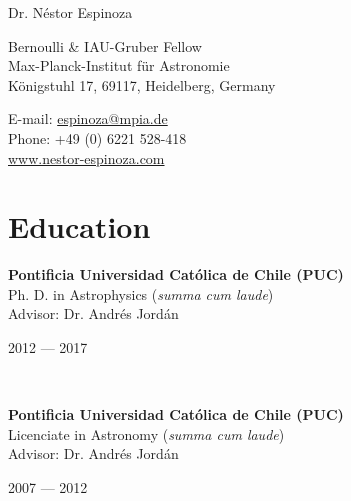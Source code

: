 \documentclass[12pt, a4paper]{article} %
\begin{document}

{\LARGE Dr. N\'estor Espinoza}\\[0.2cm] %
\begin{minipage}[t]{0.63\textwidth}
Bernoulli \& IAU-Gruber Fellow\\
Max-Planck-Institut f\"ur Astronomie\\
K\"onigstuhl 17, 69117, Heidelberg, Germany \\
\end{minipage}
\begin{minipage}[t]{0.37\textwidth}
E-mail: \href{mailto:espinoza@mpia.de}{espinoza@mpia.de}\\
Phone: +49 (0) 6221 528-418\\ 
\url{www.nestor-espinoza.com}
\end{minipage}

\hrulefill
\section*{Education}


\begin{minipage}[t]{0.6\textwidth}
\begin{flushleft}%
  \setlength{\leftskip}{0.2cm}%
\textbf{Pontificia Universidad Cat\'olica de Chile (PUC)}\\
Ph. D. in Astrophysics (\textit{summa cum laude})\\
Advisor: Dr. Andr\'es Jord\'an
 
\end{flushleft}
\end{minipage}
\begin{minipage}[t]{0.4\textwidth}
\hfill 2012 --- 2017 
\end{minipage}\\

\begin{minipage}[t]{0.6\textwidth}
\begin{flushleft}%
  \setlength{\leftskip}{0.2cm}%
\textbf{Pontificia Universidad Cat\'olica de Chile (PUC)}\\
 Licenciate in Astronomy (\textit{summa cum laude})\\
 Advisor: Dr. Andr\'es Jord\'an
 \end{flushleft}
\end{minipage}
\begin{minipage}[t]{0.4\textwidth}
\hfill 2007 --- 2012 
\end{minipage}
\end{document}
